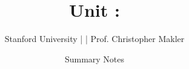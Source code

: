 \title{Unit \unitNumber{}: \unitTitle}
\date{Summary Notes}
\author{Stanford University | \course{} | Prof. Christopher Makler}

\maketitle
